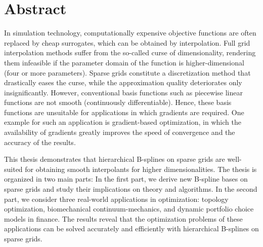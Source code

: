 
\printornamentsfalse

\section*{Abstract}

In simulation technology, computationally expensive objective functions
are often replaced by cheap surrogates,
which can be obtained by interpolation.
Full grid interpolation methods suffer from the
so-called curse of dimensionality,
rendering them infeasible if the parameter domain of the function
is higher-dimensional (four or more parameters).
Sparse grids constitute a discretization method that drastically eases the
curse, while the approximation quality deteriorates only insignificantly.
However, conventional basis functions such as piecewise linear functions
are not smooth (continuously differentiable).
Hence, these basis functions are unsuitable for applications
in which gradients are required.
One example for such an application is gradient-based optimization,
in which the availability of gradients greatly improves the speed of
convergence and the accuracy of the results.

This thesis demonstrates that hierarchical B-splines on sparse grids are
well-suited for obtaining smooth interpolants for higher dimensionalities.
The thesis is organized in two main parts:
In the first part, we derive new B-spline bases on sparse grids and study
their implications on theory and algorithms.
In the second part, we consider three real-world applications in optimization:
topology optimization, biomechanical continuum-mechanics, and
dynamic portfolio choice models in finance.
The results reveal that the optimization problems of these applications
can be solved accurately and efficiently with hierarchical B-splines on
sparse grids.

\newpage


